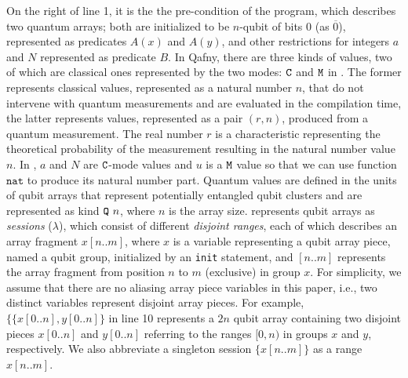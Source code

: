 On the right of  line 1, it is the the pre-condition of the program, which describes two quantum arrays; both are initialized to be $n$-qubit of bits $0$ (as $\overline{0}$), represented as predicates $A(x)$ and $A(y)$, and other restrictions for integers $a$ and $N$ represented as predicate $B$.
In Qafny, there are three kinds of values, two of which are classical ones represented by the two modes: $\texttt{C}$ and $\texttt{M}$ in . The former represents classical values, represented as a natural number $n$, that do not intervene with quantum measurements and are evaluated in the compilation time, the latter represents values, represented as a pair $(r,n)$, produced from a quantum measurement. The real number $r$ is a characteristic representing the theoretical probability of the measurement resulting in the natural number value $n$. In , $a$ and $N$ are $\texttt{C}$-mode values and $u$ is a $\texttt{M}$ value so that we can use function $\texttt{nat}$ to produce its natural number part. Quantum values are defined in the units of qubit arrays that represent potentially entangled qubit clusters and are represented as kind $\texttt{Q}~n$, where $n$ is the array size. \qafny represents qubit arrays as \emph{sessions} ($\lambda$), which consist of different \emph{disjoint ranges}, each of which describes an array fragment $x[n..m]$, where $x$ is a variable representing a qubit array piece, named a qubit group, initialized by an \texttt{init} statement, and $[n..m]$ represents the array fragment from position $n$ to $m$ (exclusive) in group $x$.
For simplicity, we assume that there are no aliasing array piece variables in this paper, i.e., two distinct variables represent disjoint array pieces. For example, $\{\{x[0..n],y[0..n]\}$ in  line 10 represents a $2n$ qubit array containing two disjoint pieces $x[0..n]$ and $y[0..n]$ referring to the ranges $[0,n)$ in groups $x$ and $y$, respectively.
We also abbreviate a singleton session $\{x[n..m]\}$ as a range $x[n..m]$.

